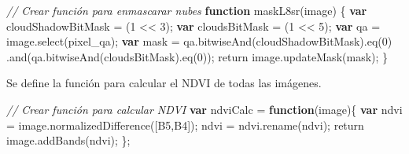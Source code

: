 \documentclass[
  12pt,
  letterpaper,
  twoside]{book}
\newenvironment{Shaded}{\begin{snugshade}}{\end{snugshade}}
\newcommand{\CommentTok}[1]{\textcolor[rgb]{0.24,0.58,0.00}{\textit{#1}}}
\newcommand{\ControlFlowTok}[1]{\textcolor[rgb]{0.00,0.00,0.00}{#1}}
\newcommand{\DecValTok}[1]{\textcolor[rgb]{0.28,0.53,0.93}{#1}}
\newcommand{\FunctionTok}[1]{\textcolor[rgb]{0.48,0.12,0.64}{#1}}
\newcommand{\KeywordTok}[1]{\textcolor[rgb]{0.00,0.00,0.00}{\textbf{#1}}}
\newcommand{\NormalTok}[1]{#1}
\newcommand{\OperatorTok}[1]{\textcolor[rgb]{0.00,0.00,0.00}{#1}}
\newcommand{\StringTok}[1]{\textcolor[rgb]{0.87,0.29,0.22}{#1}}
\begin{document}
\begin{Shaded}
\begin{Highlighting}[]
\CommentTok{// Crear función para enmascarar nubes}
\KeywordTok{function} \FunctionTok{maskL8sr}\NormalTok{(image) \{}
  \KeywordTok{var}\NormalTok{ cloudShadowBitMask }\OperatorTok{=}\NormalTok{ (}\DecValTok{1} \OperatorTok{\textless{}\textless{}} \DecValTok{3}\NormalTok{)}\OperatorTok{;}
  \KeywordTok{var}\NormalTok{ cloudsBitMask }\OperatorTok{=}\NormalTok{ (}\DecValTok{1} \OperatorTok{\textless{}\textless{}} \DecValTok{5}\NormalTok{)}\OperatorTok{;}
  \KeywordTok{var}\NormalTok{ qa }\OperatorTok{=}\NormalTok{ image}\OperatorTok{.}\FunctionTok{select}\NormalTok{(}\StringTok{\textquotesingle{}pixel\_qa\textquotesingle{}}\NormalTok{)}\OperatorTok{;}
  \KeywordTok{var}\NormalTok{ mask }\OperatorTok{=}\NormalTok{ qa}\OperatorTok{.}\FunctionTok{bitwiseAnd}\NormalTok{(cloudShadowBitMask)}\OperatorTok{.}\FunctionTok{eq}\NormalTok{(}\DecValTok{0}\NormalTok{)}
                 \OperatorTok{.}\FunctionTok{and}\NormalTok{(qa}\OperatorTok{.}\FunctionTok{bitwiseAnd}\NormalTok{(cloudsBitMask)}\OperatorTok{.}\FunctionTok{eq}\NormalTok{(}\DecValTok{0}\NormalTok{))}\OperatorTok{;}
  \ControlFlowTok{return}\NormalTok{ image}\OperatorTok{.}\FunctionTok{updateMask}\NormalTok{(mask)}\OperatorTok{;}
\NormalTok{\}}
\end{Highlighting}
\end{Shaded}

Se define la función para calcular el NDVI de todas las imágenes.

\begin{Shaded}
\begin{Highlighting}[]
\CommentTok{// Crear función para calcular NDVI}
\KeywordTok{var}\NormalTok{ ndviCalc }\OperatorTok{=} \KeywordTok{function}\NormalTok{(image)\{}
  \KeywordTok{var}\NormalTok{ ndvi }\OperatorTok{=}\NormalTok{ image}\OperatorTok{.}\FunctionTok{normalizedDifference}\NormalTok{([}\StringTok{\textquotesingle{}B5\textquotesingle{}}\OperatorTok{,}\StringTok{\textquotesingle{}B4\textquotesingle{}}\NormalTok{])}\OperatorTok{;}
\NormalTok{  ndvi }\OperatorTok{=}\NormalTok{ ndvi}\OperatorTok{.}\FunctionTok{rename}\NormalTok{(}\StringTok{\textquotesingle{}ndvi\textquotesingle{}}\NormalTok{)}\OperatorTok{;}
    \ControlFlowTok{return}\NormalTok{ image}\OperatorTok{.}\FunctionTok{addBands}\NormalTok{(ndvi)}\OperatorTok{;}
\NormalTok{\}}\OperatorTok{;}
\end{Highlighting}
\end{Shaded}
\end{document}
